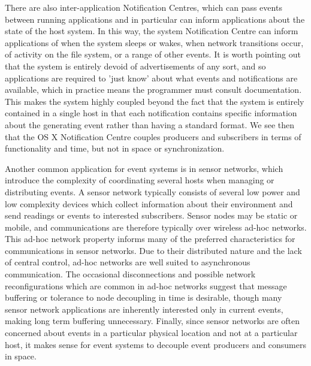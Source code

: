 \documentclass{acm_proc_article-sp}
\begin{document}
There are also inter-application Notification Centres, which can pass events between running applications and in particular can inform applications about the state of the host system. In this way, the system Notification Centre can inform applications of when the system sleeps or wakes, when network transitions occur, of activity on the file system, or a range of other events. It is worth pointing out that the system is entirely devoid of advertisements of any sort, and so applications are required to 'just know' about what events and notifications are available, which in practice means the programmer must consult documentation. This makes the system highly coupled beyond the fact that the system is entirely contained in a single host in that each notification contains specific information about the generating event rather than having a standard format. We see then that the OS X Notification Centre couples producers and subscribers in terms of functionality and time, but not in space or synchronization. 


Another common application for event systems is in sensor networks, which introduce the complexity of coordinating several hosts when managing or distributing events. A sensor network typically consists of several low power and low complexity devices which collect information about their environment and send readings or events to interested subscribers. Sensor nodes may be static or mobile, and communications are therefore typically over wireless ad-hoc networks. This ad-hoc network property informs many of the preferred characteristics for communications in sensor networks. Due to their distributed nature and the lack of central control, ad-hoc networks are well suited to asynchronous communication. The occasional disconnections and possible network reconfigurations which are common in ad-hoc networks suggest that message buffering or tolerance to node decoupling in time is desirable, though many sensor network applications are inherently interested only in current events, making long term buffering unnecessary. Finally, since sensor networks are often concerned about events in a particular physical location and not at a particular host, it makes sense for event systems to decouple event producers and consumers in space. 
\end{document}
